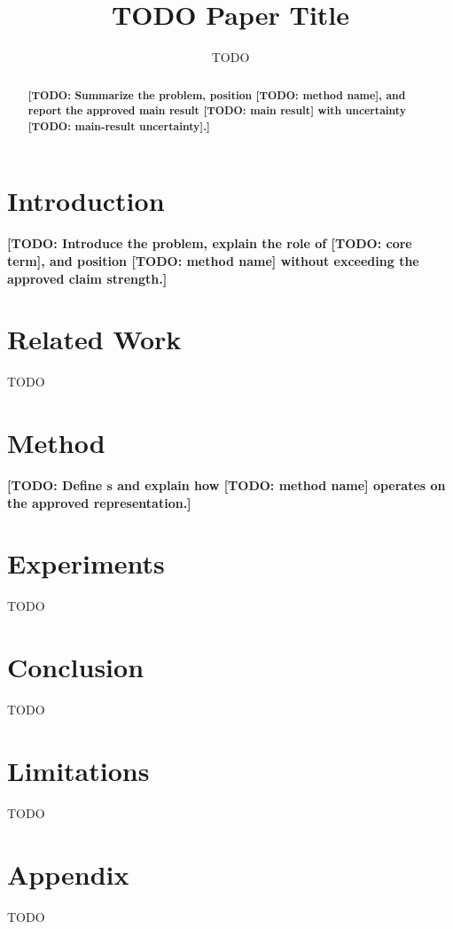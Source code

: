 \documentclass{article}
\title{TODO Paper Title}
\author{TODO}
\providecommand{\PaperTODO}[1]{\textbf{[TODO: #1]}}
\providecommand{\MethodName}{\PaperTODO{method name}}
\providecommand{\CoreTerm}{\PaperTODO{core term}}
\providecommand{\StateSymbol}{\ensuremath{\mathbf{s}}}
\providecommand{\MainResult}{\PaperTODO{main result}}
\providecommand{\MainResultUncertainty}{\PaperTODO{main-result uncertainty}}
\begin{document}
\maketitle
 \begin{abstract}
\PaperTODO{Summarize the problem, position \MethodName{}, and report the approved main result \MainResult{} with uncertainty \MainResultUncertainty{}.}
\end{abstract}
 \section{Introduction}
\PaperTODO{Introduce the problem, explain the role of \CoreTerm{}, and position \MethodName{} without exceeding the approved claim strength.}
 \section{Related Work}
TODO
 \section{Method}
\PaperTODO{Define \StateSymbol{} and explain how \MethodName{} operates on the approved representation.}
 \section{Experiments}
TODO
 \section{Conclusion}
TODO
 \section{Limitations}
TODO
 

\appendix
\section{Appendix}
TODO
 
\end{document}
